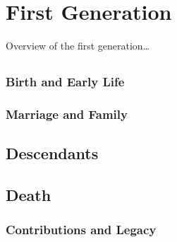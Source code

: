 \chapter{First Generation}
\label{ch3: First Generation}

Overview of the first generation\dots

\section[Alexander McDonald]{\mcdonaldAName}
\label{sec: Alexander McDonald}
\lipsum[1]

\subsection{Birth and Early Life}
\lipsum[1]

\subsection{Marriage and Family}
\lipsum[1]

\section{Descendants}

\section{Death}

\subsection{Contributions and Legacy}
\lipsum[1]